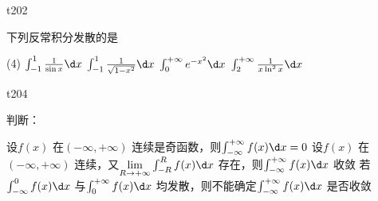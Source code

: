 \begin{question}
    t202

    下列反常积分发散的是
    \begin{tasks}(4)
        \task   $ \int_{-1}^{1} \frac{1}{\sin x} \d x $ 
        \task   $ \int_{-1}^{1} \frac{1}{\sqrt{1 - x^2}} \d x $ 
        \task   $ \int_{0}^{+\infty} e^{-x^2} \d x $ 
        \task   $ \int_{2}^{+\infty} \frac{1}{x\ln^2 x} \d x $ 
    \end{tasks}
\end{question}

\begin{question}
    t204

    判断：
    \begin{tasks}
        \task   设$ f(x) $ 在$ (-\infty, +\infty) $ 连续是奇函数，则$ \int_{-\infty}^{+\infty} f(x) \d x = 0 $ 
        \task   设$ f(x) $ 在$ (-\infty, +\infty) $ 连续，又$ \lim\limits_{R \to +\infty} \int_{-R}^{R} f(x) \d x $ 存在，则$ \int_{-\infty}^{+\infty} f(x) \d x $ 收敛
        \task   若$ \int_{-\infty}^{0} f(x) \d x $ 与$ \int_{0}^{+\infty} f(x) \d x $ 均发散，则不能确定$ \int_{-\infty}^{+\infty} f(x) \d x $ 是否收敛  
    \end{tasks}
\end{question}
